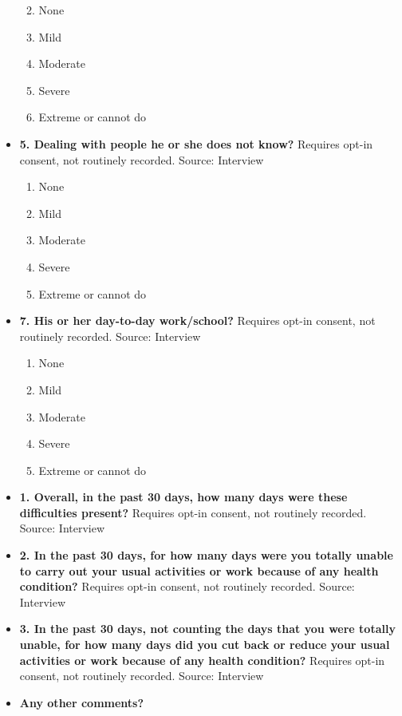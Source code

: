 \documentclass[
]{scrartcl}
\providecommand{\tightlist}{%
  \setlength{\itemsep}{0pt}\setlength{\parskip}{0pt}}\usepackage{longtable,booktabs,array}
\begin{document}
\begin{itemize}
  \begin{enumerate}
  \def\labelenumi{\arabic{enumi}.}
  \tightlist
  \item
    None
  \item
    Mild
  \item
    Moderate
  \item
    Severe
  \item
    Extreme or cannot do
  \end{enumerate}
\item
  \textbf{5. Dealing with people he or she does not know?} Requires
  opt-in consent, not routinely recorded. Source: Interview

  \begin{enumerate}
  \def\labelenumi{\arabic{enumi}.}
  \tightlist
  \item
    None
  \item
    Mild
  \item
    Moderate
  \item
    Severe
  \item
    Extreme or cannot do
  \end{enumerate}
\item
  \textbf{7. His or her day-to-day work/school?} Requires opt-in
  consent, not routinely recorded. Source: Interview

  \begin{enumerate}
  \def\labelenumi{\arabic{enumi}.}
  \tightlist
  \item
    None
  \item
    Mild
  \item
    Moderate
  \item
    Severe
  \item
    Extreme or cannot do
  \end{enumerate}
\item
  \textbf{1. Overall, in the past 30 days, how many days were these
  difficulties present?} Requires opt-in consent, not routinely
  recorded. Source: Interview
\item
  \textbf{2. In the past 30 days, for how many days were you totally
  unable to carry out your usual activities or work because of any
  health condition?} Requires opt-in consent, not routinely recorded.
  Source: Interview
\item
  \textbf{3. In the past 30 days, not counting the days that you were
  totally unable, for how many days did you cut back or reduce your
  usual activities or work because of any health condition?} Requires
  opt-in consent, not routinely recorded. Source: Interview
\item
  \textbf{Any other comments?}
\end{itemize}
\end{document}
